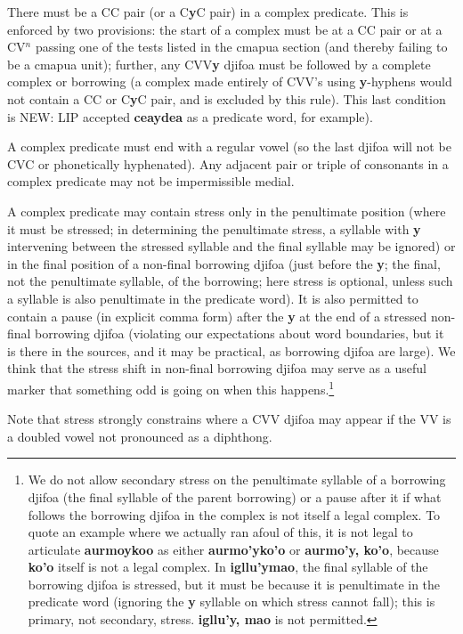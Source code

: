 \documentclass[12pt]{book}
\begin{document}
There must be a CC pair (or a C{\bf y}C pair) in a complex predicate.  This is enforced by two provisions:  the start of a complex must be at a CC pair or
at a CV$^n$ passing one of the tests listed in the cmapua section (and thereby failing to be a cmapua unit);  further, any CVV{\bf y} djifoa must be followed by a complete complex or borrowing  (a complex made entirely of CVV's using {\bf y}-hyphens would not contain a CC or C{\bf y}C pair, and is excluded by this rule).  This last condition is NEW:
LIP accepted {\bf ceaydea} as a predicate word, for example).

A complex predicate must end with a regular vowel (so the last djifoa will not be CVC or phonetically hyphenated).  Any adjacent pair or triple of consonants in a complex predicate may not be
impermissible medial.

A complex predicate may contain stress only in the penultimate position (where it must be stressed; in determining the penultimate stress, a syllable with {\bf y} intervening between the stressed syllable and the final syllable may be ignored) or in the final position of a non-final borrowing djifoa (just before the {\bf y}; the final, not the penultimate syllable, of the borrowing; here stress is optional, unless such a syllable is also penultimate in the predicate word).  It is also permitted to contain a pause 
(in explicit comma form) after the {\bf y} at the end of  a stressed non-final borrowing djifoa (violating our expectations about word boundaries, but it is there in the sources, and it may be practical, as borrowing djifoa are large).   We think that the stress shift in non-final borrowing djifoa may serve as a useful marker that something odd is going on when this happens.\footnote{We do not allow secondary stress on the penultimate syllable of a borrowing djifoa (the final syllable of the parent borrowing) or a pause after it if what follows the borrowing djifoa in the complex is not itself a legal complex.  To quote an example where we actually ran afoul of this, it is not legal to articulate {\bf aurmoykoo} as either {\bf aurmo'yko'o} or {\bf aurmo'y, ko'o}, because {\bf ko'o} itself is not a legal complex.  In {\bf igllu'ymao}, the final syllable of the borrowing djifoa is stressed, but it must be because it is penultimate in the predicate word
(ignoring the {\bf y} syllable on which stress cannot fall); this is primary, not secondary, stress.  {\bf igllu'y, mao} is not permitted.}

Note that stress strongly constrains where a CVV djifoa may appear if the VV is a doubled vowel not pronounced as a diphthong.
\end{document}
